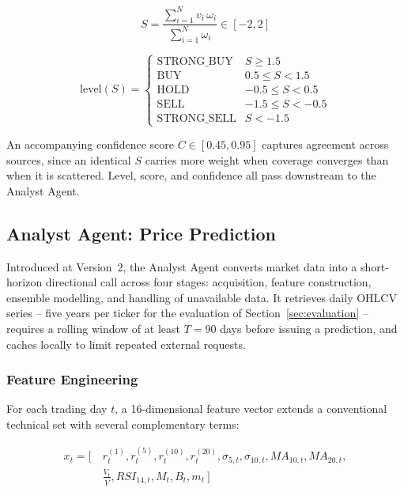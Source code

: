 \documentclass[conference]{IEEEtran}
\begin{document}
\begin{equation}
S = \frac{\sum_{i=1}^{N} v_i\,\omega_i}{\sum_{i=1}^{N} \omega_i} \in [-2,2]
\end{equation}

\begin{equation}
\mathrm{level}(S) =
\begin{cases}
\text{STRONG\_BUY} & S \geq 1.5 \\
\text{BUY} & 0.5 \leq S < 1.5 \\
\text{HOLD} & -0.5 \leq S < 0.5 \\
\text{SELL} & -1.5 \leq S < -0.5 \\
\text{STRONG\_SELL} & S < -1.5
\end{cases}
\label{eq:level-thresholds}
\end{equation}

An accompanying confidence score $C \in [0.45, 0.95]$ captures agreement across sources, since an identical $S$ carries more weight when coverage converges than when it is scattered. Level, score, and confidence all pass downstream to the Analyst Agent.

\subsection{Analyst Agent: Price Prediction}

Introduced at Version~2, the Analyst Agent converts market data into a short-horizon directional call across four stages: acquisition, feature construction, ensemble modelling, and handling of unavailable data. It retrieves daily OHLCV series -- five years per ticker for the evaluation of Section~\ref{sec:evaluation} -- requires a rolling window of at least $T=90$ days before issuing a prediction, and caches locally to limit repeated external requests.

\subsubsection{Feature Engineering}

For each trading day $t$, a 16-dimensional feature vector extends a conventional technical set with several complementary terms:

\begin{equation}
\begin{aligned}
x_t = \big[\ &r_t^{(1)}, r_t^{(5)}, r_t^{(10)}, r_t^{(20)}, \sigma_{5,t}, \sigma_{10,t}, MA_{10,t}, MA_{20,t}, \\
&\textstyle\frac{V_t}{\bar{V}}, RSI_{14,t}, M_t, B_t, m_t\ \big]
\end{aligned}
\end{equation}
\end{document}
